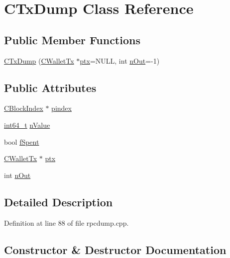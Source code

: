\hypertarget{class_c_tx_dump}{}\section{C\+Tx\+Dump Class Reference}
\label{class_c_tx_dump}
\subsection*{Public Member Functions}
\begin{DoxyCompactItemize}
\item 
\hyperlink{class_c_tx_dump_a24c253b4afd04471ca984a5cda09c4b6}{C\+Tx\+Dump} (\hyperlink{class_c_wallet_tx}{C\+Wallet\+Tx} $\ast$\hyperlink{class_c_tx_dump_a35bc70e8a048c6a5c7d7d75007d23d24}{ptx}=N\+U\+L\+L, int \hyperlink{class_c_tx_dump_a4b59015f367c546b94f2710c8410f3df}{n\+Out}=-\/1)
\end{DoxyCompactItemize}
\subsection*{Public Attributes}
\begin{DoxyCompactItemize}
\item 
\hyperlink{class_c_block_index}{C\+Block\+Index} $\ast$ \hyperlink{class_c_tx_dump_a98da78bae1b040ff7e8f33cd7a91ccd0}{pindex}
\item 
\hyperlink{stdint_8h_adec1df1b8b51cb32b77e5b86fff46471}{int64\+\_\+t} \hyperlink{class_c_tx_dump_afca3ced942672136928b8f2cefc77ee7}{n\+Value}
\item 
bool \hyperlink{class_c_tx_dump_ab9414670ba3167741093b69bf8ff3d3c}{f\+Spent}
\item 
\hyperlink{class_c_wallet_tx}{C\+Wallet\+Tx} $\ast$ \hyperlink{class_c_tx_dump_a35bc70e8a048c6a5c7d7d75007d23d24}{ptx}
\item 
int \hyperlink{class_c_tx_dump_a4b59015f367c546b94f2710c8410f3df}{n\+Out}
\end{DoxyCompactItemize}


\subsection{Detailed Description}


Definition at line 88 of file rpcdump.\+cpp.



\subsection{Constructor \& Destructor Documentation}
\hypertarget{class_c_tx_dump_a24c253b4afd04471ca984a5cda09c4b6}{}
